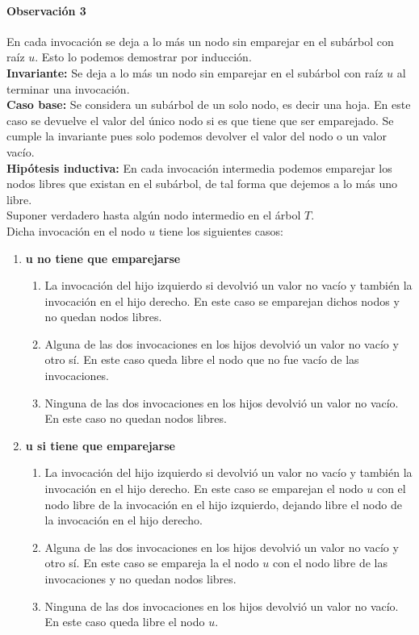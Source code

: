 \documentclass[12pt]{article}
\begin{document}
\paragraph{Observación 3} En cada invocación se deja a lo más un nodo sin emparejar  en el subárbol con raíz $u$. Esto lo podemos demostrar por inducción.\\
\textbf{Invariante: } Se deja a lo más un nodo sin emparejar  en el subárbol con raíz $u$ al terminar una invocación.\\
\textbf{Caso base:} Se considera un subárbol de un solo nodo, es decir una hoja. En este caso se devuelve el valor del único nodo si es que tiene que ser emparejado. Se cumple la invariante pues solo podemos devolver el valor del nodo o un valor vacío.\\
\textbf{Hipótesis inductiva:} En cada invocación intermedia podemos emparejar los nodos libres que existan en el subárbol, de tal forma que dejemos a lo más uno libre.\\
Suponer verdadero hasta algún nodo intermedio en el árbol $T$.\\
Dicha invocación en el nodo $u$ tiene los siguientes casos:
\begin{enumerate}
	\item \textbf{u no tiene que emparejarse}
	\begin{enumerate}
		\item La invocación del hijo izquierdo si devolvió un valor no vacío y también la invocación en el hijo derecho. En este caso se emparejan dichos nodos y no quedan nodos libres.
		\item Alguna de las dos invocaciones en los hijos devolvió un valor no vacío y otro sí. En este caso queda libre el nodo que no fue vacío de las invocaciones.
		\item Ninguna de las dos invocaciones en los hijos devolvió un valor no vacío. En este caso no quedan nodos libres.
	\end{enumerate}
	\item \textbf{u si tiene que emparejarse}
	\begin{enumerate}
		\item La invocación del hijo izquierdo si devolvió un valor no vacío y también la invocación en el hijo derecho. En este caso se emparejan el nodo $u$ con el nodo libre de la invocación en el hijo izquierdo, dejando libre el nodo de la invocación en el hijo derecho.
		\item Alguna de las dos invocaciones en los hijos devolvió un valor no vacío y otro sí. En este caso se empareja la el nodo $u$ con el nodo libre de las invocaciones y no quedan nodos libres.
		\item Ninguna de las dos invocaciones en los hijos devolvió un valor no vacío. En este caso queda libre el nodo $u$.
	\end{enumerate}
\end{enumerate}
\end{document}
